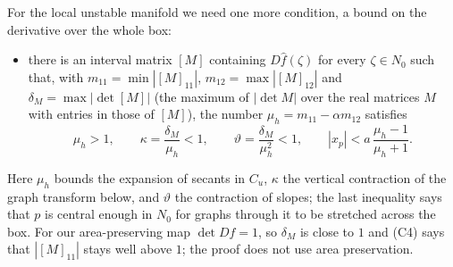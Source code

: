 \documentclass[11pt]{article}
\theoremstyle{definition}
\begin{document}
For the local unstable manifold we need one more condition, a bound on the derivative over the whole box:
\begin{itemize}
\item[(C4)] there is an interval matrix $[M]$ containing $D\hat f(\zeta)$ for every $\zeta \in N_0$ such that, with $m_{11} = \min|[M]_{11}|$, $m_{12} = \max|[M]_{12}|$ and $\delta_M = \max|\det[M]|$ (the maximum of $|\det M|$ over the real matrices $M$ with entries in those of $[M]$), the number $\mu_h = m_{11} - \alpha m_{12}$ satisfies
\[
  \mu_h > 1, \qquad \kappa = \frac{\delta_M}{\mu_h} < 1, \qquad \vartheta = \frac{\delta_M}{\mu_h^2} < 1, \qquad |x_p| < a\,\frac{\mu_h - 1}{\mu_h + 1} .
\]
\end{itemize}
Here $\mu_h$ bounds the expansion of secants in $C_u$, $\kappa$ the vertical contraction of the graph transform below, and $\vartheta$ the contraction of slopes; the last inequality says that $p$ is central enough in $N_0$ for graphs through it to be stretched across the box. For our area-preserving map $\det Df = 1$, so $\delta_M$ is close to $1$ and (C4) says that $|[M]_{11}|$ stays well above $1$; the proof does not use area preservation.
\end{document}
